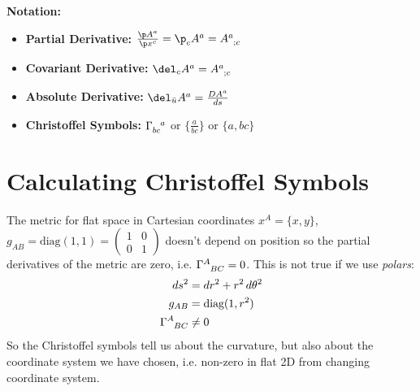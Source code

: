 \documentclass[a4paper, 11pt, normalem]{report}
\begin{document}
\textbf{Notation:}
\begin{itemize}
    \item \textbf{Partial Derivative:} $\frac{\p A^a}{\p x^c} = \p_cA^a = \tensor{A}{^a_{;c}}$
    \item \textbf{Covariant Derivative:} $\del_cA^a=\tensor{A}{^a_{;c}}$
    \item \textbf{Absolute Derivative:} $\del_{\bar{u}}A^a = \frac{DA^a}{ds}$
    \item \textbf{Christoffel Symbols:} $\tensor{\Gamma}{_{bc}^a}$ or $\{\frac{a}{bc}\}$ or $\{a,bc\}$
\end{itemize}

\chapter{Calculating Christoffel Symbols}
\begin{example}
The metric for flat space in Cartesian coordinates $x^A = \{x,y\}$, $g_{AB} = \text{diag}(1,1) = \begin{pmatrix} 1 & 0 \\ 0 & 1 \end{pmatrix}$ doesn't depend on position so the partial derivatives of the metric are zero, i.e. $\tensor{\Gamma}{^A_{BC}} = 0$.
This is not true if we use \emph{polars}:
\begin{align}
    ds^2 &= dr^2 + r^2\,d\theta^2 \\
    g_{AB} &= \text{diag}(1,r^2) \\
    \tensor{\Gamma}{^A_{BC}} &\neq 0
\end{align}
So the Christoffel symbols tell us about the curvature, but also about the coordinate system we have chosen, i.e. non-zero in flat 2D from changing coordinate system. 
\end{example}
\end{document}
